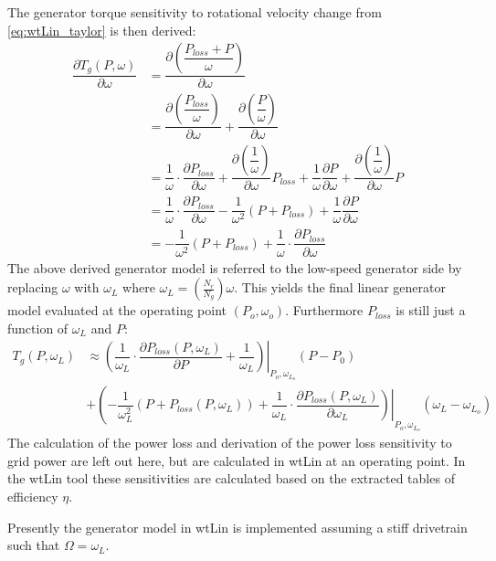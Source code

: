 The generator torque sensitivity to rotational velocity change from \cref{eq:wtLin_taylor} is then derived:
\begin{align}
	\dfrac{\partial T_g(P, \omega)}{\partial \omega} & = \dfrac{\partial \left (\dfrac{P_{loss} +  P}{\omega}\right )}{\partial \omega} \\
	& = \dfrac{\partial \left (\dfrac{P_{loss}}{\omega} \right )}{\partial \omega} + \dfrac{\partial \left (\dfrac{P}{\omega} \right )}{\partial \omega} \\
	& = \dfrac{1}{\omega} \cdot \dfrac{\partial P_{loss}}{\partial \omega} + \dfrac{\partial \left (\dfrac{1}{\omega} \right)}{\partial \omega} P_{loss} + \dfrac{1}{\omega} \dfrac{\partial P}{\partial \omega} + \dfrac{\partial \left (\dfrac{1}{\omega} \right )}{\partial \omega} P \\
	& = \dfrac{1}{\omega} \cdot  \dfrac{\partial P_{loss}}{\partial \omega} - \dfrac{1}{\omega^2}(P + P_{loss}) + \dfrac{1}{\omega} \dfrac{\partial P}{\partial \omega} \\
	& = -\dfrac{1}{\omega^2}(P + P_{loss}) + \dfrac{1}{\omega} \cdot \dfrac{\partial P_{loss}}{\partial \omega}
\end{align}
The above derived generator model is referred to the low-speed generator side by replacing $ \omega $ with $ \omega_L $ where $ \omega_L = \left (\frac{N_r}{N_g} \right ) \omega $. This yields the final linear generator model evaluated at the operating point $ (P_o, \omega_o) $. Furthermore $P_{loss}$ is still just a function of $ \omega_L $ and $ P $:
\begin{equation}
	\begin{split}
		T_g(P, \omega_L) 	& \approx \left. \left ( \dfrac{1}{\omega_L} \cdot \dfrac{\partial P_{loss}(P, \omega_L)}{\partial P} + \dfrac{1}{\omega_L} \right ) \right |_{P_o,\omega_{L_o}} (P - P_0) \\ 
		& + \left ( -\dfrac{1}{\omega_L^2}(P + P_{loss}(P, \omega_L)) + \left. \dfrac{1}{\omega_L} \cdot \dfrac{\partial P_{loss}(P, \omega_L)}{\partial \omega_L} \right ) \right |_{P_o,\omega_{L_o}} (\omega_L - \omega_{L_o})
	\end{split}
\end{equation}
The calculation of the power loss and derivation of the power loss sensitivity to grid power are left out here, but are calculated in wtLin at an operating point. In the wtLin tool these sensitivities are calculated based on the extracted tables of efficiency $ \eta $.

Presently the generator model in wtLin is implemented assuming a stiff drivetrain such that $ \Omega = \omega_L $.


